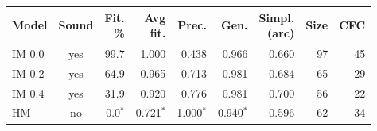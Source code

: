 \begin{tabular}{@{}lcrrrrrrr@{}}
\toprule
Model & Sound & \makecell[r]{Fit.\\\%} & \makecell[r]{Avg\\fit.} & Prec. & Gen. & \makecell[r]{Simpl.\\(arc)} & Size & CFC \\
\midrule
IM 0.0 & yes & 99.7 & 1.000 & 0.438 & 0.966 & 0.660 & 97 & 45 \\
IM 0.2 & yes & 64.9 & 0.965 & 0.713 & 0.981 & 0.684 & 65 & 29 \\
IM 0.4 & yes & 31.9 & 0.920 & 0.776 & 0.981 & 0.700 & 56 & 22 \\
HM & no & 0.0$^{*}$ & 0.721$^{*}$ & 1.000$^{*}$ & 0.940$^{*}$ & 0.596 & 62 & 34 \\
\bottomrule
\end{tabular}

